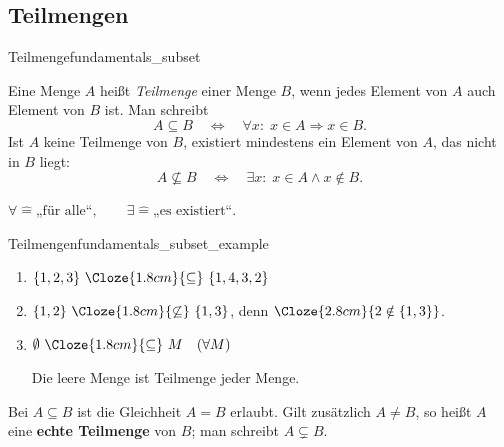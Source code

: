 \subsection{Teilmengen}
\label{subsec:fundamentals_subsets}

\begin{DefinitionBox}{Teilmenge}{fundamentals_subset}
  \begin{minipage}[t]{0.62\linewidth}
    \vspace{0pt}
    Eine Menge $A$ heißt \emph{Teilmenge}  einer Menge
    $B$, wenn jedes Element von $A$ auch Element von $B$ ist. Man schreibt
    \[
      A\subseteq B
      \quad\Longleftrightarrow\quad
      \forall x:\; x\in A\Rightarrow x\in B.
    \]
    Ist $A$ keine Teilmenge von $B$, existiert mindestens ein Element von $A$,
    das nicht in $B$ liegt:
    \[
      A\not\subseteq B
      \quad\Longleftrightarrow\quad
      \exists x:\; x\in A\land x\notin B.
    \]
  \end{minipage}\hfill
  \begin{minipage}[t]{0.32\linewidth}
    \vspace{0pt}
    \centering
  \end{minipage}
  \par\smallskip
  \hfill
  {\footnotesize\color{black!55}
    $\forall\mathrel{\widehat{=}}\text{„für alle“},\qquad
     \exists\mathrel{\widehat{=}}\text{„es existiert“}$.}
\end{DefinitionBox}

\begin{ExampleBox}[after skip=0pt]{Teilmengen}{fundamentals_subset_example}
  \begin{enumerate}[label=\alph*),itemsep=0.6em]
    \item $\{1,2,3\}\ \Cloze{1.8cm}{\subseteq}\ \{1,4,3,2\}$
    \item $\{1,2\}\ \Cloze{1.8cm}{\not\subseteq}\ \{1,3\}$,
      denn $\Cloze{2.8cm}{2\notin\{1,3\}}$.
    \item $\emptyset\ \Cloze{1.8cm}{\subseteq}\ M\quad(\forall M)$
    \par\smallskip
    Die leere Menge ist Teilmenge jeder Menge.
  \end{enumerate}
\end{ExampleBox}

\par\nobreak
\begin{RemarkBox}[before skip=0.35\baselineskip]
  Bei $A\subseteq B$ ist die Gleichheit $A=B$ erlaubt. Gilt zusätzlich
  $A\neq B$, so heißt $A$ eine \textbf{echte Teilmenge}
   von $B$; man schreibt $A\subsetneq B$.
\end{RemarkBox}
